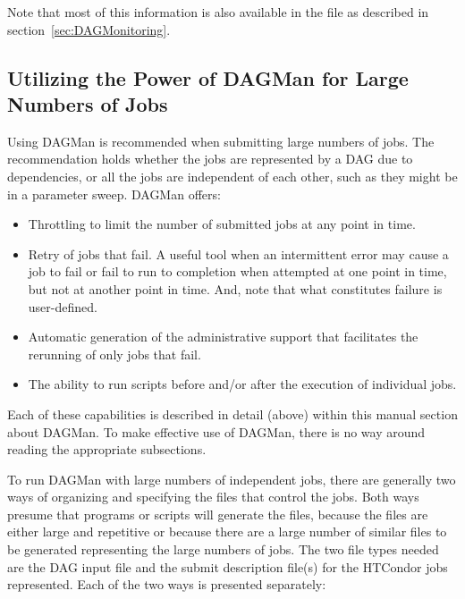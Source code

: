 Note that most of this information is also available in the
 file as described in section~\ref{sec:DAGMonitoring}.

\subsection{\label{sec:DAGLotsaJobs}Utilizing the Power of DAGMan for Large Numbers of Jobs}

Using DAGMan is recommended when submitting large numbers of jobs.
The recommendation holds whether the jobs are represented by
a DAG due to dependencies, or all the jobs are
independent of each other, such as they might be in a parameter sweep.
DAGMan offers:
\begin{itemize}
\item{Throttling}
  to limit the number of submitted jobs at any point in time.
\item{Retry of jobs that fail.}
  A useful tool when an intermittent error may cause a job to fail
  or fail to run to completion when attempted at one point in time,
  but not at another point in time.
  And, note that what constitutes failure is user-defined.
\item{Automatic generation of the administrative support that facilitates the
  rerunning of only jobs that fail.}
\item{The ability to run scripts before and/or after the execution of
individual jobs.}
\end{itemize}

Each of these capabilities is described in detail (above)
within this manual section about DAGMan.
To make effective use of DAGMan, there is no way around reading the 
appropriate subsections.

To run DAGMan with large numbers of independent jobs,
there are generally two ways of organizing and specifying the
files that control the jobs.
Both ways presume that programs or scripts will generate the files,
because the files are either large and repetitive
or because there are a large number of similar files to be
generated representing the large numbers of jobs.
The two file types needed are the DAG input file and the
submit description file(s) for the HTCondor jobs represented.
Each of the two ways is presented separately:

